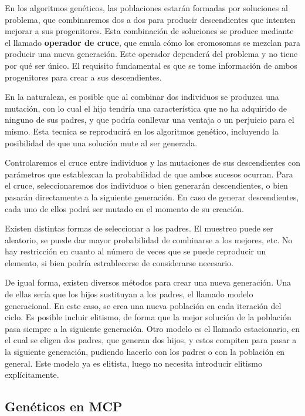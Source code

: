 En los algoritmos genéticos, las poblaciones estarán formadas por soluciones al
problema, que combinaremos dos a dos para producir descendientes que intenten mejorar
a sus progenitores. Esta combinación de soluciones se produce mediante el llamado
\textbf{operador de cruce}, que emula cómo los cromosomas se mezclan para producir
una nueva generación. Este operador dependerá del problema y no tiene por qué ser único.
El requisito fundamental es que se tome información de ambos progenitores para crear
a sus descendientes.

En la naturaleza, es posible que al combinar dos individuos se produzca una mutación,
con lo cual el hijo tendría una característica que no ha adquirido de ninguno de sus
padres, y que podría conllevar una ventaja o un perjuicio para el mismo. Esta tecnica
se reproducirá en los algoritmos genético, incluyendo la posibilidad de que una
solución mute al ser generada.

Controlaremos el cruce entre individuos y las mutaciones de sus descendientes con
parámetros que establezcan la probabilidad de que ambos sucesos ocurran. Para el
cruce, seleccionaremos dos individuos o bien generarán descendientes, o bien
pasarán directamente a la siguiente generación. En caso de generar descendientes,
cada uno de ellos podrá ser mutado en el momento de su creación.

Existen distintas formas de seleccionar a los padres. El muestreo puede ser aleatorio,
se puede dar mayor probabilidad de combinarse a los mejores, etc. No hay restricción
en cuanto al número de veces que se puede reproducir un elemento, si bien podría
estrablecerse de considerarse necesario.

De igual forma, existen diversos métodos para crear una nueva generación. Una de
ellas sería que los hijos sustituyan a los padres, el llamado modelo generacional.
En este caso, se crea una nueva población en cada iteración del ciclo.
Es posible incluir elitismo, de forma que la mejor solución de la población pasa
siempre a la siguiente generación. Otro modelo es el llamado estacionario, en el
cual se eligen dos padres, que generan dos hijos, y estos compiten para pasar a
la siguiente generación, pudiendo hacerlo con los padres o con la población en
general. Este modelo ya es elitista, luego no necesita introducir elitismo explícitamente.

\subsection{Genéticos en MCP}

